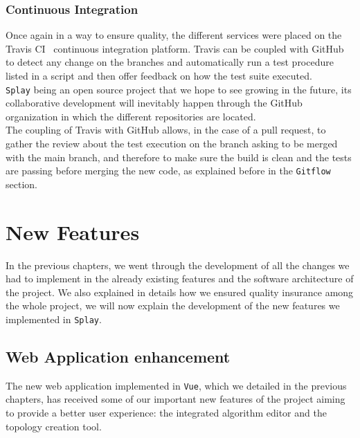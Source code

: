 \documentclass{eplmastersthesis}
\begin{document}
      \subsection{Continuous Integration}

        Once again in a way to ensure quality, the different services were placed
        on the Travis CI~\cite{travis} continuous integration platform. Travis
        can be coupled with GitHub to detect any change on the branches and
        automatically run a test procedure listed in a script and then offer
        feedback on how the test suite executed.\\

        \texttt{Splay} being an open source project that we hope to see growing in the
        future, its collaborative development will inevitably happen through
        the GitHub organization in which the different repositories are located.\\
        The coupling of Travis with GitHub allows, in the case of a pull request,
        to gather the review about the test execution on the branch asking to be
        merged with the main branch, and therefore to make sure the build is
        clean and the tests are passing before merging the new code, as
        explained before in the \texttt{Gitflow} section.

    \chapter{New Features}
    \label{chap:newfeat}

      In the previous chapters, we went through the development of all
      the changes we had to implement in the already existing features
      and the software architecture of the project. We also explained
      in details how we ensured quality insurance among the whole project,
      we will now explain the development of the new features we implemented in
      \texttt{Splay}.

      \section{Web Application enhancement}

        The new web application implemented in \texttt{Vue}, which we detailed in
        the previous chapters, has received some of our important new features
        of the project aiming to provide a better user experience: the
        integrated algorithm editor and the topology creation tool.
\end{document}
